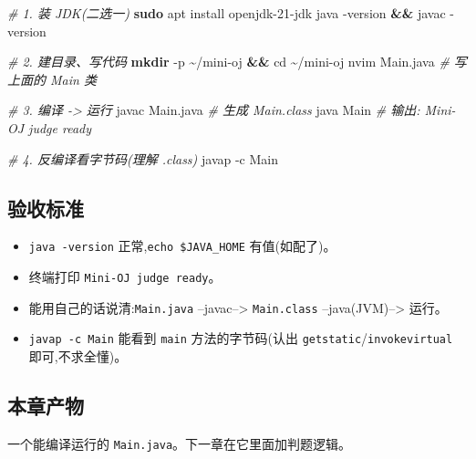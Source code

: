 \documentclass[
  11pt,
]{ctexart}
\newenvironment{Shaded}{\begin{snugshade}}{\end{snugshade}}
\newcommand{\AttributeTok}[1]{\textcolor[rgb]{0.13,0.29,0.53}{#1}}
\newcommand{\BuiltInTok}[1]{#1}
\newcommand{\CommentTok}[1]{\textcolor[rgb]{0.56,0.35,0.01}{\textit{#1}}}
\newcommand{\ExtensionTok}[1]{#1}
\newcommand{\FunctionTok}[1]{\textcolor[rgb]{0.13,0.29,0.53}{\textbf{#1}}}
\newcommand{\KeywordTok}[1]{\textcolor[rgb]{0.13,0.29,0.53}{\textbf{#1}}}
\newcommand{\NormalTok}[1]{#1}
\providecommand{\tightlist}{%
  \setlength{\itemsep}{0pt}\setlength{\parskip}{0pt}}
\begin{document}
\begin{Shaded}
\begin{Highlighting}[]
\CommentTok{\# 1. 装 JDK(二选一)}
\FunctionTok{sudo}\NormalTok{ apt install openjdk{-}21{-}jdk}
\ExtensionTok{java} \AttributeTok{{-}version} \KeywordTok{\&\&} \ExtensionTok{javac} \AttributeTok{{-}version}

\CommentTok{\# 2. 建目录、写代码}
\FunctionTok{mkdir} \AttributeTok{{-}p}\NormalTok{ \textasciitilde{}/mini{-}oj }\KeywordTok{\&\&} \BuiltInTok{cd}\NormalTok{ \textasciitilde{}/mini{-}oj}
\ExtensionTok{nvim}\NormalTok{ Main.java          }\CommentTok{\# 写上面的 Main 类}

\CommentTok{\# 3. 编译 {-}\textgreater{} 运行}
\ExtensionTok{javac}\NormalTok{ Main.java         }\CommentTok{\# 生成 Main.class}
\ExtensionTok{java}\NormalTok{ Main               }\CommentTok{\# 输出: Mini{-}OJ judge ready}

\CommentTok{\# 4. 反编译看字节码(理解 .class)}
\ExtensionTok{javap} \AttributeTok{{-}c}\NormalTok{ Main}
\end{Highlighting}
\end{Shaded}

\hypertarget{ux9a8cux6536ux6807ux51c6}{%
\subsection{验收标准}\label{ux9a8cux6536ux6807ux51c6}}

\begin{itemize}
\tightlist
\item[$\square$]
  \texttt{java\ -version} 正常,\texttt{echo\ \$JAVA\_HOME}
  有值(如配了)。
\item[$\square$]
  终端打印 \texttt{Mini-OJ\ judge\ ready}。
\item[$\square$]
  能用自己的话说清:\texttt{Main.java} --javac--\textgreater{}
  \texttt{Main.class} --java(JVM)--\textgreater{} 运行。
\item[$\square$]
  \texttt{javap\ -c\ Main} 能看到 \texttt{main} 方法的字节码(认出
  \texttt{getstatic}/\texttt{invokevirtual} 即可,不求全懂)。
\end{itemize}

\hypertarget{ux672cux7ae0ux4ea7ux7269}{%
\subsection{本章产物}\label{ux672cux7ae0ux4ea7ux7269}}

一个能编译运行的 \texttt{Main.java}。下一章在它里面加判题逻辑。
\end{document}
